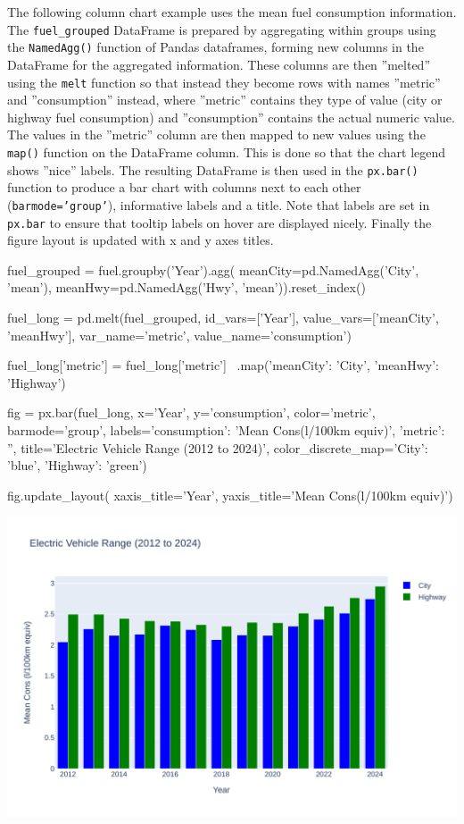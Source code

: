 The following column chart example uses the mean fuel consumption information. The \texttt{fuel\_grouped} DataFrame is prepared by aggregating within groups using the \texttt{NamedAgg()} function of Pandas dataframes, forming new columns in the DataFrame for the aggregated information. These columns are then ''melted'' using the \texttt{melt} function so that instead they become rows with names ''metric'' and ''consumption'' instead, where ''metric'' contains they type of value (city or highway fuel consumption) and ''consumption'' contains the actual numeric value.  The values in the ''metric'' column are then mapped to new values using the \texttt{map()} function on the DataFrame column. This is done so that the chart legend shows ''nice'' labels. The resulting DataFrame is then used in the \texttt{px.bar()} function to produce a bar chart with columns next to each other (\texttt{barmode='group'}), informative labels and a title. Note that labels are set in \texttt{px.bar} to ensure that tooltip labels on hover are displayed nicely. Finally the figure layout is updated with x and y axes titles.

\begin{samepage}
\begin{pythoncode}
fuel_grouped = fuel.groupby('Year').agg(
       meanCity=pd.NamedAgg('City', 'mean'),
       meanHwy=pd.NamedAgg('Hwy', 'mean')).reset_index()

fuel_long = pd.melt(fuel_grouped, 
                id_vars=['Year'], 
                value_vars=['meanCity', 'meanHwy'], 
                var_name='metric', 
                value_name='consumption')

fuel_long['metric'] = fuel_long['metric'] \
       .map({'meanCity': 'City', 'meanHwy': 'Highway'})

fig = px.bar(fuel_long, x='Year', y='consumption', 
   color='metric', barmode='group',
   labels={'consumption': 'Mean Cons\n(l/100km equiv)', 'metric': ''},
   title='Electric Vehicle Range (2012 to 2024)',
   color_discrete_map={'City': 'blue', 'Highway': 'green'})

fig.update_layout(
    xaxis_title='Year', 
    yaxis_title='Mean Cons\n(l/100km equiv)')
\end{pythoncode}
\end{samepage}

\begin{center}
  \includegraphics[width=.8\textwidth]{px.fuel.columns.pdf}
\end{center}

